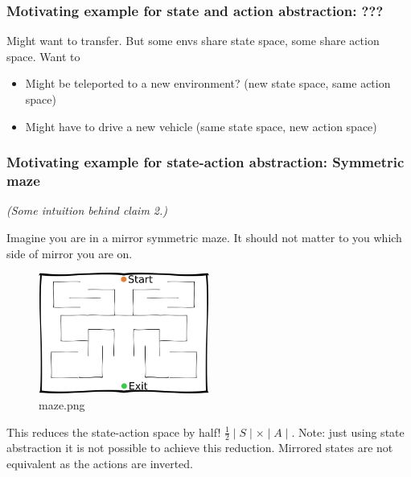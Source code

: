 \hypertarget{motivating-example-for-state-and-action-abstraction}{%
\subsubsection{Motivating example for state and action abstraction:
???}\label{motivating-example-for-state-and-action-abstraction}}

Might want to transfer. But some envs share state space, some share
action space. Want to

\begin{itemize}
\tightlist
\item
  Might be teleported to a new environment? (new state space, same
  action space)
\item
  Might have to drive a new vehicle (same state space, new action space)
\end{itemize}

\hypertarget{motivating-example-for-state-action-abstraction-symmetric-maze}{%
\subsubsection{Motivating example for state-action abstraction:
Symmetric
maze}\label{motivating-example-for-state-action-abstraction-symmetric-maze}}

\emph{(Some intuition behind claim 2.)}

Imagine you are in a mirror symmetric maze. It should not matter to you
which side of mirror you are on.

\begin{figure}
\centering
\includegraphics[width=0.5\textwidth,height=0.5\textheight]{../../pictures/drawings/maze.png}
\caption{maze.png}
\end{figure}

This reduces the state-action space by half!
\(\frac{1}{2}\mid S \mid \times \mid A \mid\). Note: just using state
abstraction it is not possible to achieve this reduction. Mirrored
states are not equivalent as the actions are inverted.

